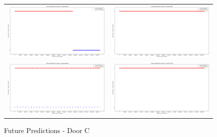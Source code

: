\begin{figure}
  \begin{tabular}{cc}
    {\includegraphics[width = 3in]{images/results/Future_door_C_Duckett.png}} &
    {\includegraphics[width = 3in]{images/results/Future_door_C_FreMEn.png}} \\
    {\includegraphics[width = 3in]{images/results/Future_door_C_Gaussian.png}} &
    {\includegraphics[width = 3in]{images/results/Future_door_C_HyT-EM.png}} \\
  \end{tabular}
  \caption{Future Predictions - Door C}
\end{figure}\\ \\

